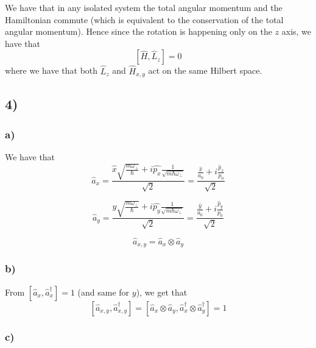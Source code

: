 \documentclass[10pt,a4paper]{book}
\begin{document}
We have that in any isolated system the total angular momentum and the Hamiltonian commute (which is equivalent to the conservation of the total angular momentum). Hence since the rotation is happening only on the $z$ axis, we have that $$[\hat{H},\hat{L}_z]=0$$
where we have that both $\hat{L}_z$ and $\hat{H}_{x,y}$ act on the same Hilbert space.


\subsection*{4)}

\subsubsection*{a)}

We have that 
$$\hat{a}_x=\frac{\hat{x}\sqrt{\frac{m\omega_{\perp}}{\hbar}}+i\hat{p_x}\frac{1}{\sqrt{m\hbar\omega_{\perp}}}}{\sqrt{2}}=\frac{\frac{\hat{x}}{a_0}+i\frac{\hat{p}_x}{p_0}}{\sqrt{2}}$$

$$\hat{a}_y=\frac{\hat{y}\sqrt{\frac{m\omega_{\perp}}{\hbar}}+i\hat{p_y}\frac{1}{\sqrt{m\hbar\omega_{\perp}}}}{\sqrt{2}}=\frac{\frac{\hat{y}}{a_0}+i\frac{\hat{p}_y}{p_0}}{\sqrt{2}}$$

$$\hat{a}_{x,y}=\hat{a}_x\otimes\hat{a}_y$$

\subsubsection*{b)}
From $[\hat{a}_x,\hat{a}^{\dagger}_x]=1$ (and same for $y$), we get that 
$$[\hat{a}_{x,y},\hat{a}^{\dagger}_{x,y}]=[\hat{a}_x\otimes\hat{a}_y,\hat{a}^{\dagger}_x\otimes \hat{a}^{\dagger}_y]=1$$

\subsubsection*{c)}
\end{document}
